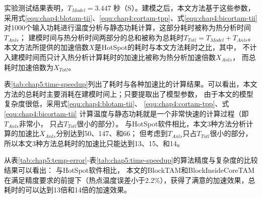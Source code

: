 实验测试结果表明，$T_{Model} = 3.447$ 秒（S）。建模之后，本文方法基于这些参数，采用式\ref{equ:chap4:blotam-tii}、\ref{equ:chap4:cortam-tpp}、式\ref{equ:chap4:bicortam-tii} 对1000个输入功耗进行温度分析与静态功耗计算，这部分耗时被称为热分析时间$T_{Anls}$； 建模时间与热分析时间两部分的总和被称为总耗时$T_{Totl}=T_{Model}+T_{Anls}$。 本文方法所提供的加速倍数$X$是HotSpot的耗时与本文方法耗时之比，其中， 不计入建模时间而只计入热分析计算耗时的加速比被称为热分析加速倍数$X_{Anls}$， 而总耗时加速倍数为$X_{Totl}$。

表\ref{tab:chap5:time-speedup}列出了耗时与各种加速比的计算结果。可以看出，本文方法的总耗时主要消耗在建模时间上；只要提取出了模型参数， 由于本文的模型复杂度很低，采用式\ref{equ:chap4:blotam-tii}、 \ref{equ:chap4:cortam-tpp}、式\ref{equ:chap4:bicortam-tii} 计算温度与静态功耗就是一个非常快速的计算过程（即$T_{Anls}$非常小， 只占$T_{Totl}$很小的部分）。 与HotSpot软件相比，本文3种方法分析计算的加速比$X_{Anls}$分别达到50、147、和66； 但考虑到$T_{Anls}$只占$T_{Totl}$很小的部分，所以本文3种方法总耗时的加速比只能达到13、15、和14。

从表\ref{tab:chap5:temp-error}-表\ref{tab:chap5:time-speedup}的算法精度与复杂度的比较结果可以看出： 与HotSpot软件相比， 本文的BlockTAM和BlockInsideCoreTAM在满足精度要求的前提下（热点温度误差小于2.2\%），获得了满意的加速效果，总耗时的可以达到13倍和14倍的加速效果。

